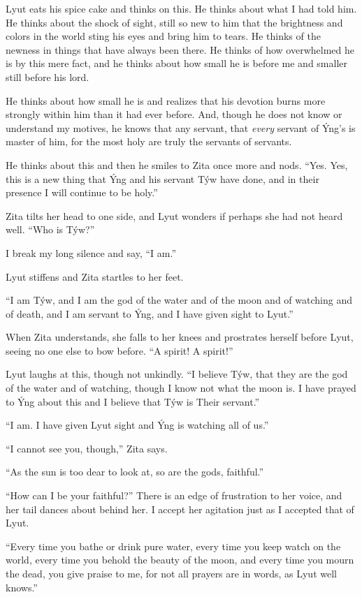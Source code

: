 Lyut eats his spice cake and thinks on this. He thinks about what I had told him. He thinks about the shock of sight, still so new to him that the brightness and colors in the world sting his eyes and bring him to tears. He thinks of the newness in things that have always been there. He thinks of how overwhelmed he is by this mere fact, and he thinks about how small he is before me and smaller still before his lord.

He thinks about how small he is and realizes that his devotion burns more strongly within him than it had ever before. And, though he does not know or understand my motives, he knows that any servant, that \emph{every} servant of Ýng's is master of him, for the most holy are truly the servants of servants.

He thinks about this and then he smiles to Zita once more and nods. ``Yes. Yes, this is a new thing that Ýng and his servant Týw have done, and in their presence I will continue to be holy.''

Zita tilts her head to one side, and Lyut wonders if perhaps she had not heard well. ``Who is Týw?''

I break my long silence and say, ``I am.''

Lyut stiffens and Zita startles to her feet.

``I am Týw, and I am the god of the water and of the moon and of watching and of death, and I am servant to Ýng, and I have given sight to Lyut.''

When Zita understands, she falls to her knees and prostrates herself before Lyut, seeing no one else to bow before. ``A spirit! A spirit!''

Lyut laughs at this, though not unkindly. ``I believe Týw, that they are the god of the water and of watching, though I know not what the moon is. I have prayed to Ýng about this and I believe that Týw is Their servant.''

``I am. I have given Lyut sight and Ýng is watching all of us.''

``I cannot see you, though,'' Zita says.

``As the sun is too dear to look at, so are the gods, faithful.''

``How can I be your faithful?'' There is an edge of frustration to her voice, and her tail dances about behind her. I accept her agitation just as I accepted that of Lyut.

``Every time you bathe or drink pure water, every time you keep watch on the world, every time you behold the beauty of the moon, and every time you mourn the dead, you give praise to me, for not all prayers are in words, as Lyut well knows.''

